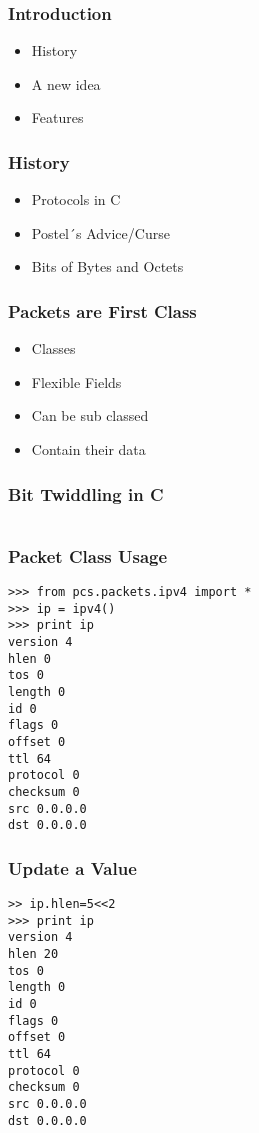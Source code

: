 \maketitle
\begin{frame}
	\frametitle{Introduction}
	\begin{itemize}
	\item History
	\item A new idea
	\item Features
	\end{itemize}
\end{frame}

\begin{frame}
	\frametitle{History}
	\begin{itemize}
	\item Protocols in C
	\item Postel´s Advice/Curse
	\item Bits of Bytes and Octets
	\end{itemize}
\end{frame}

\begin{frame}
	\frametitle{Packets are First Class}
	\begin{itemize}
	\item Classes
	\item Flexible Fields
	\item Can be sub classed
	\item Contain their data
	\end{itemize}
\end{frame}

\begin{frame}
	\frametitle{Bit Twiddling in C}
	\begin{lstlisting}

	\end{lstlisting}
\end{frame}

\begin{frame}
	\frametitle{Packet Class Usage}
	\begin{lstlisting}
>>> from pcs.packets.ipv4 import *
>>> ip = ipv4()
>>> print ip
version 4
hlen 0
tos 0
length 0
id 0
flags 0
offset 0
ttl 64
protocol 0
checksum 0
src 0.0.0.0
dst 0.0.0.0
	\end{lstlisting}
\end{frame}


\begin{frame}
	\frametitle{Update a Value}
	\begin{lstlisting}
>> ip.hlen=5<<2
>>> print ip
version 4
hlen 20
tos 0
length 0
id 0
flags 0
offset 0
ttl 64
protocol 0
checksum 0
src 0.0.0.0
dst 0.0.0.0
	\end{lstlisting}
\end{frame}


